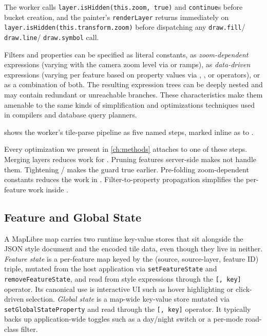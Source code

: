 \begin{description}
\begin{description}
The worker calls \texttt{layer.isHidden(this.zoom, true)} and \texttt{continue}s before bucket creation, and the painter's \texttt{renderLayer} returns immediately on\newline
\texttt{layer.isHidden(this.transform.zoom)} before dispatching any \texttt{draw.fill}/ \texttt{draw.line}/ \texttt{draw.symbol} call.
\end{description}
\end{description}

Filters and properties can be specified as literal constants, as \emph{zoom-dependent} expressions (varying with the camera zoom level via  or  ramps), as \emph{data-driven} expressions (varying per feature based on property values via , , or  operators), or as a combination of both.
The resulting expression trees can be deeply nested and may contain redundant or unreachable branches.
These characteristics make them amenable to the same kinds of simplification and optimizations techniques used in compilers and database query planners.

 shows the worker's tile-parse pipeline as five named steps, marked inline as  to .

\noindent Every optimization we present in \cref{ch:methods} attaches to one of these steps.
Merging layers reduces work for .
Pruning features server-side makes  not handle them.
Tightening /  makes the  guard true earlier.
Pre-folding zoom-dependent constants reduces the work in .
Filter-to-property propagation simplifies the per-feature work inside .

\subsection{Feature and Global State}\label{sub:feature_state}

A MapLibre map carries two runtime key-value stores that sit alongside the JSON style document and the encoded tile data, even though they live in neither.
\emph{Feature state} is a per-feature map keyed by the (source, source-layer, feature ID) triple, mutated from the host application via \texttt{setFeatureState} and \texttt{removeFeatureState}, and read from style expressions through the \texttt{[,~key]} operator.
Its canonical use is interactive UI such as hover highlighting or click-driven selection.
\emph{Global state} is a map-wide key-value store mutated via \texttt{setGlobalStateProperty} and read through the \texttt{[,~key]} operator.
It typically backs up application-wide toggles such as a day/night switch or a per-mode road-class filter.

